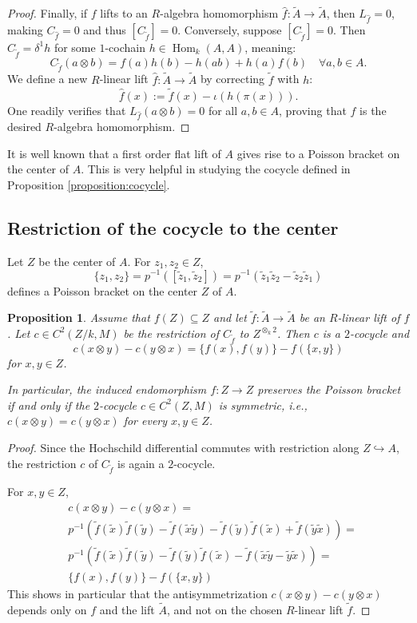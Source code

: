 \documentclass[a4paper,11pt,reqno]{amsart}%
\newtheorem{proposition}[theorem]{Proposition}
\theoremstyle{definition}
\newcommand{\Hom}{\operatorname{Hom}}
\newcommand{\<}{\<}
\renewcommand{\>}{\>}
\newcommand{\lA}{\widetilde{A}}
\newcommand{\lf}{\widetilde{f}}
\numberwithin{equation}{subsection}
\begin{document}
\begin{proof}
Finally, if $f$ lifts to an $R$-algebra homomorphism $\widehat{f}: \lA \to \lA$, then $L_{\widehat{f}} = 0$, making $C_{\widehat{f}} = 0$ and thus $[C_{\lf}] = 0$. Conversely, suppose $[C_{\lf}] = 0$. Then $C_{\lf} = \delta^1 h$ for some $1$-cochain $h \in \Hom_k(A,A)$, meaning:
$$
C_{\lf}(a \otimes b) = f(a)h(b) - h(ab) + h(a)f(b) \quad \forall a,b \in A.
$$
We define a new $R$-linear lift $\widehat{f}: \lA \to \lA$ by correcting $\lf$ with $h$:
$$
\widehat{f}(x) := \lf(x) - \iota(h(\pi(x))).
$$
One readily verifies that $L_{\widehat{f}}(a \otimes b) = 0$ for all $a,b \in A$, proving that $\widehat{f}$ is the desired $R$-algebra homomorphism.
\end{proof}

It is well known that a first order flat lift of $A$ gives rise to a Poisson bracket on the 
center of $A$. This is very helpful in studying the cocycle defined in Proposition \ref{proposition:cocycle}.

\subsection{Restriction of the cocycle to the center}

Let $Z$ be the center of $A$. For $z_1, z_2\in Z$, 
$$
\{z_1, z_2\} = p^{-1}([\tilde{z}_1, \tilde{z}_2]) = p^{-1}(\tilde{z}_1 \tilde{z}_2 - \tilde{z}_2 \tilde{z}_1)
$$ 
defines a Poisson bracket on the center $Z$ 
of $A$.

\begin{proposition}\label{proposition:symmetric}
    Assume that $f(Z) \subseteq Z$ and let $\lf: \lA \rightarrow \lA$ be an $R$-linear lift of 
    $f$. Let $c \in C^2(Z/k,M)$ be the restriction of $C_{\lf}$ to $Z^{\otimes_k 2}$. Then $c$ is a $2$-cocycle and
    $$
    c(x \otimes y) - c(y \otimes x) =  \{f(x), f(y)\} - f(\{x, y\}) 
    $$
    for $x, y\in Z$.
    
    In particular, 
the induced endomorphism $f: Z\rightarrow Z$ preserves
    the Poisson bracket if and only if the $2$-cocycle $c\in C^2(Z, M)$
    is symmetric, i.e., 
    $c(x \otimes y) = c(y \otimes x)$ for 
    every $x, y\in Z$.
\end{proposition}
\begin{proof}
Since the Hochschild differential commutes with restriction along $Z\hookrightarrow A$, the restriction $c$ of $C_{\lf}$ is again a $2$-cocycle.

For $x, y\in Z$,
\begin{align*}
&c(x \otimes y) - c(y \otimes x) = \\
&p^{-1}(\lf(\tilde{x}) \lf(\tilde{y}) - 
\lf(\tilde{x}\tilde{y}) - 
\lf(\tilde{y}) \lf(\tilde{x}) +
\lf(\tilde{y}\tilde{x})) = \\
&p^{-1}(\lf(\tilde{x}) \lf(\tilde{y}) - 
\lf(\tilde{y}) \lf(\tilde{x}) -
\lf(\tilde{x}\tilde{y} - \tilde{y}\tilde{x})) =\\
&\{f(x), f(y)\} - f(\{x, y\})
\end{align*}
This shows in particular that the antisymmetrization $c(x \otimes y) - c(y \otimes x)$ depends only on $f$ and the lift $\lA$, and not on the chosen $R$-linear lift $\lf$.
\end{proof}
\end{document}
